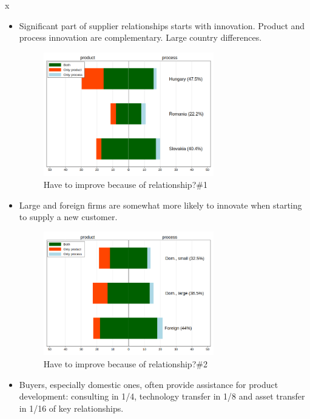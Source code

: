 x\documentclass[final, dvipsnames, authoryear,12pt]{elsarticle}
\begin{document}
\begin{itemize}
    \item Significant part of supplier relationships starts with innovation. Product and process innovation are complementary. Large country differences.
    \begin{figure}[!h]
        \centering
        \includegraphics[width=0.7\textwidth]{graphs/Fig7a.png}
        \caption{Have to improve because of relationship?\#1}
        \label{fig:my_label}
    \end{figure}
    \item Large and foreign firms are somewhat more likely to innovate when starting to supply a new customer.
    \begin{figure}[!h]
        \centering
        \includegraphics[width=0.7\textwidth]{graphs/Fig7b.png}
        \caption{Have to improve because of relationship?\#2}
        \label{fig:my_label}
    \end{figure}
    \item Buyers, especially domestic ones, often provide assistance for product development: consulting in 1/4, technology transfer in 1/8 and asset transfer in 1/16 of key relationships.
    
\end{itemize}
\end{document}

